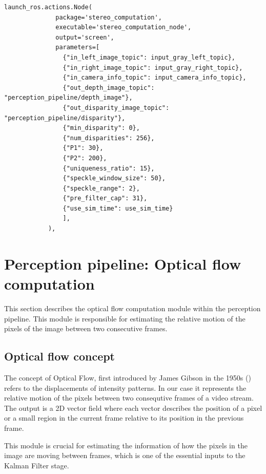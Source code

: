 \begin{lstlisting}[language=FTMpython,style=PythonStyleFTM,caption={Stereo computation launch},label={code:scl}]
  launch_ros.actions.Node(
              package='stereo_computation', 
              executable='stereo_computation_node',
              output='screen',
              parameters=[
                {"in_left_image_topic": input_gray_left_topic},
                {"in_right_image_topic": input_gray_right_topic},
                {"in_camera_info_topic": input_camera_info_topic},
                {"out_depth_image_topic": "perception_pipeline/depth_image"},
                {"out_disparity_image_topic": "perception_pipeline/disparity"},
                {"min_disparity": 0},
                {"num_disparities": 256},
                {"P1": 30},
                {"P2": 200},
                {"uniqueness_ratio": 15},
                {"speckle_window_size": 50},
                {"speckle_range": 2},
                {"pre_filter_cap": 31},
                {"use_sim_time": use_sim_time}
                ],
            ),
\end{lstlisting}%

\newpage
\section{Perception pipeline: Optical flow computation}\label{sec:PerceptionPipelineOpticalFlowComputation}

This section describes the optical flow computation module within the perception pipeline.
This module is responsible for estimating the relative motion of the pixels of the image between
two consecutive frames.

\subsection{Optical flow concept}\label{sec:OpticalFlowConcept}
The concept of Optical Flow, first introduced by James Gibson in the 1950s (\cite{optical_flow_concept}) 
refers to the displacements of intensity patterns.  In our case it represents the relative motion 
of the pixels between two consequtive frames of a video stream. The output is  a 2D vector field where 
each vector describes the position of a pixel or a small region in the current frame relative to its 
position in the previous frame.

This module is crucial for estimating the information of how the pixels in the image are moving between frames, which is
one of the essential inputs to the Kalman Filter stage. 

